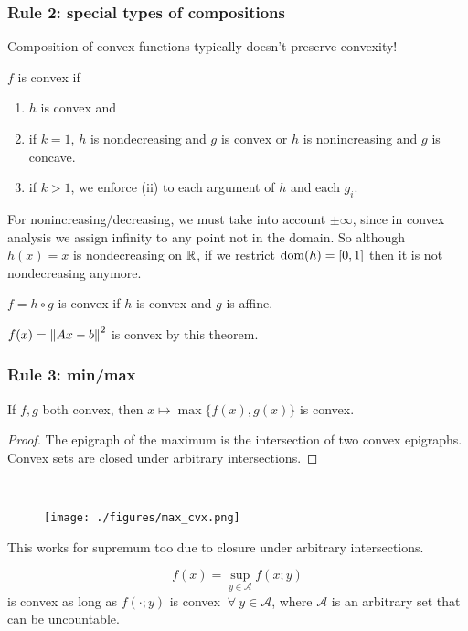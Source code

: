 \documentclass[class=article,crop=false]{standalone}
\begin{document}
\subsubsection{Rule 2: special types of compositions}

Composition of convex functions typically doesn't preserve convexity!

\begin{thm}
$ f$ is convex if
 \begin{enumerate}[label=(\roman*)]
	\item $ h$ is convex and
	\item if $ k=1$, $ h$ is nondecreasing and  $ g$ is convex or $ h$ is nonincreasing and  $ g$ is concave.
	\item if  $ k>1$, we enforce (ii) to each argument of  $ h$ and each $ g_i$.
\end{enumerate}
\end{thm}
\begin{note}
	For nonincreasing/decreasing, we must take into account $ \pm \infty$, since in convex analysis we assign infinity to any point not in the domain. So although $ h(x) = x$ is nondecreasing on  $ \mathbb{R}$, if we restrict $ \operatorname{dom}(h) = [0,1]$ then it is not nondecreasing anymore.
\end{note}
\begin{thm}
$ f= h\circ g$ is convex if  $ h$ is convex and  $ g$ is affine.
\end{thm}

\begin{eg}
	$ f(x) = {\left\lVert{ Ax-b}\right\rVert}^2 $ is convex by this theorem.
\end{eg}
\subsubsection{Rule 3: min/max}

\begin{prop}
	If $ f,g$ both convex, then $ x\mapsto \max \{f(x),g(x)\} $ is convex.
\end{prop}
\begin{proof}
The epigraph of the maximum is the intersection of two convex epigraphs. Convex sets are closed under arbitrary intersections.
\end{proof}
~\begin{figure}[H]
	\centering
	\texttt{[image: ./figures/max\_cvx.png]}
\end{figure}
\begin{note}
This works for supremum too due to closure under arbitrary intersections.
\end{note}
\begin{eg}
\[
	f(x) = \sup_{y \in \mathcal{ A}} f(x;y) 
\] 
is convex as long as $ f( \cdot ; y)$ is convex $ \ \forall \ y \in \mathcal{ A}$, where $ \mathcal{ A}$ is an arbitrary set that can be uncountable.
\end{eg}
\end{document}
